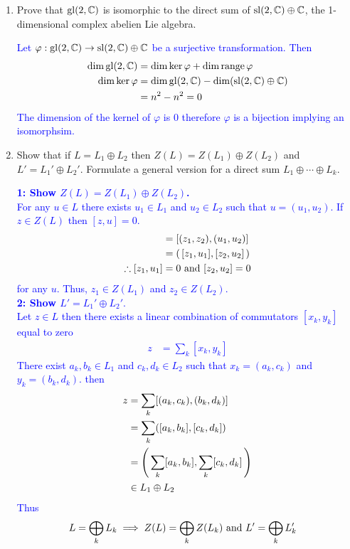 \documentclass[12pt,a4paper]{report}
\newcommand{\BLUE}[1]{\textcolor{blue}{#1}}
\newcommand{\GL}{\operatorname{gl}}
\newcommand{\SL}{\operatorname{sl}}
\begin{document}
\begin{enumerate}[label=2.\arabic*]
\begin{enumerate}[label=(\roman*)]
	\item Prove that $\GL(2,\C)$ is isomorphic to the direct sum of $\SL(2,\C) \oplus \C$, the 1-dimensional complex abelien Lie algebra.
	
	\BLUE{Let $\varphi : \GL(2,\C) \to \SL(2,\C)\oplus \C$ be a surjective transformation.  Then
	\begin{align*}
		\dim \GL(2,\C) &= \dim \ker \varphi + \dim \operatorname{range} \varphi \\		
		\dim \ker \varphi &= \dim \GL(2,\C) -\dim (\SL(2,\C)\oplus \C) \\
		&= n^2 - n^2 = 0
\end{align*}	The dimension of the kernel of $\varphi$ is 0 therefore $\varphi$ is a bijection implying an isomorphsim.
	}
	
	\item Show that if $L=L_1 \oplus L_2$ then $Z(L)=Z(L_1)\oplus Z(L_2)$ and $L'=L_1'\oplus L_2'$.  Formulate a general version for a direct sum $L_1\oplus \cdots \oplus L_k$.
	
	\BLUE{\textbf{1: Show $Z(L)=Z(L_1)\oplus Z(L_2)$.} \\For any $u \in L$ there exists $u_1 \in L_1$ and $u_2\in L_2$ such that $u=(u_1, u_2)$.  If $z \in Z(L)$ then $[z,u]=0$.
	\begin{align*}
		[z, u] &= [(z_1,z_2), (u_1,u_2)] \\
		&= \PAREN{[z_1,u_1], [z_2,u_2]} \\
		\therefore [z_1,u_1] &=0 \AND [z_2,u_2]=0
	\end{align*}for any $u$. Thus, $z_1 \in Z(L_1)$ and $z_2 \in Z(L_2)$.\\
	\textbf{2: Show $L'=L_1'\oplus L_2'$}.  \\Let $z \in L$ then there exists a linear combination of commutators $[x_k,y_k]$ equal to zero
	\begin{align*}
		z &= \sum_k [x_k,y_k]
	\end{align*}There exist $a_k,b_k \in L_1$ and $c_k,d_k \in L_2$ such that $x_k = (a_k, c_k)$ and $y_k=(b_k, d_k)$. then 
	\begin{align*}
		z &= \sum_k [(a_k, c_k),(b_k, d_k)] \\
		&= \sum_k ([a_k,b_k],[c_k,d_k]) \\
		&= \left (\, \sum_k [a_k,b_k], \sum_k [c_k,d_k] \,\right ) \\
		&\in L_1 \oplus L_2
	\end{align*}Thus
	\begin{align*}
		L &= \bigoplus_k L_k \implies Z(L) = \bigoplus_k Z(L_k) \text{ and } L' = \bigoplus_k L_k'
\end{align*}		
	}
	

\end{enumerate}
\end{enumerate}
\end{document}
